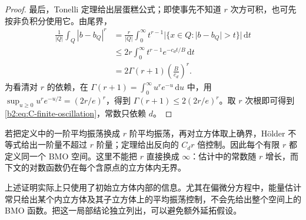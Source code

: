 \begin{proof}
最后，Tonelli 定理给出层蛋糕公式；即使事先不知道 \(r\) 次方可积，也可先按非负积分使用它。由尾界，
\[
 \begin{aligned}
 \frac1{|Q|}\int_Q|b-b_Q|^r
 &=\frac r{|Q|}\int_0^\infty
 t^{r-1}|\{x\in Q:|b-b_Q|>t\}|\,\mathrm dt\\
 &\leq2r\int_0^\infty t^{r-1}e^{-c_dt/B}\,\mathrm dt\\
 &=2\Gamma(r+1)\left(\frac B{c_d}\right)^r.
 \end{aligned}
\]
为看清对 \(r\) 的依赖，在 \(\Gamma(r+1)=\int_0^\infty u^re^{-u}\,\mathrm du\) 中，用
\(\sup_{u\geq0}u^re^{-u/2}=(2r/e)^r\)，得到
\(\Gamma(r+1)\leq2(2r/e)^r\)。取 \(r\) 次根即可得到\eqref{b2:eq:C-finite-oscillation}，常数只依赖 \(d\)。
\end{proof}
若把定义中的一阶平均振荡换成 \(r\) 阶平均振荡，再对立方体取上确界，Hölder 不等式给出一阶量不超过 \(r\) 阶量；定理给出反向的 \(C_dr\) 倍控制。因此每个有限 \(r\) 都定义同一个 BMO 空间。这里不能把 \(r\) 直接换成 \(\infty\)：估计中的常数随 \(r\) 增长，而下文的对数函数仍在每个含原点的立方体内无界。

\ProseParagraphBreak

上述证明实际上只使用了初始立方体内部的信息。尤其在偏微分方程中，能量估计常只给出某个内立方体及其子立方体上的平均振荡控制，不会先给出整个空间上的 BMO 函数。把这一局部结论独立列出，可以避免额外延拓假设。

